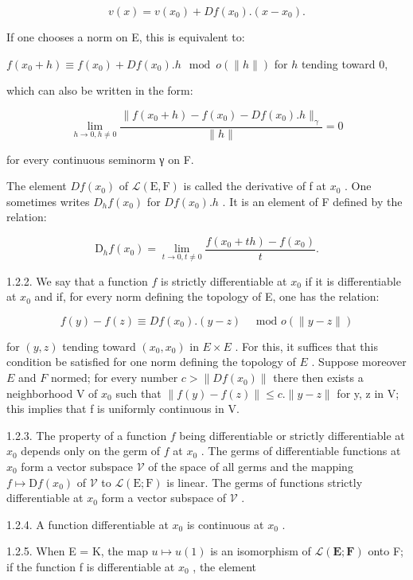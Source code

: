 \[
v (x) = v \left(x _ {0}\right) + D f \left(x _ {0}\right). \left(x - x _ {0}\right).
\]

If one chooses a norm on E, this is equivalent to:

\(f(x_0 + h) \equiv f(x_0) + Df(x_0).h \mod o(\|h\|)\) for \(h\) tending toward 0,

which can also be written in the form:

\[
\lim _ {h \rightarrow 0, h \neq 0} \frac {\| f (x _ {0} + h) - f (x _ {0}) - D f (x _ {0}) . h \| _ {\gamma}}{\| h \|} = 0
\]

for every continuous seminorm γ on F.

The element \(Df(x_{0})\) of \(\mathcal{L}(\mathrm{E},\mathrm{F})\) is called the derivative of f at \(x_{0}\) . One sometimes writes \(D_{h}f(x_{0})\) for \(Df(x_{0}).h\) . It is an element of F defined by the relation:

\[
\mathrm{D} _ {h} f (x _ {0}) = \lim _ {t \rightarrow 0, t \neq 0} \frac {f (x _ {0} + t h) - f (x _ {0})}{t}.
\]

1.2.2. We say that a function \(f\) is strictly differentiable at \(x_{0}\) if it is differentiable at \(x_{0}\) and if, for every norm defining the topology of E, one has the relation:

\[
f (y) - f (z) \equiv D f (x _ {0}). (y - z) \quad \text {   mod   } o (\| y - z \|)
\]

for \((y, z)\) tending toward \((x_0, x_0)\) in \(E \times E\) . For this, it suffices that this condition be satisfied for one norm defining the topology of \(E\) . Suppose moreover \(E\) and \(F\) normed; for every number \(c > \|Df(x_0)\|\) there then exists a neighborhood V of \(x_{0}\) such that \(\|f(y)-f(z)\|\leqslant c.\|y-z\|\) for y, z in V; this implies that f is uniformly continuous in V.

1.2.3. The property of a function \(f\) being differentiable or strictly differentiable at \(x_{0}\) depends only on the germ of \(f\) at \(x_{0}\) . The germs of differentiable functions at \(x_{0}\) form a vector subspace \(\mathcal{V}\) of the space of all germs and the mapping \(f\mapsto\mathrm{D}f(x_{0})\) of \(\mathcal{V}\) to \(\mathcal{L}(\mathrm{E};\mathrm{F})\) is linear. The germs of functions strictly differentiable at \(x_{0}\) form a vector subspace of \(\mathcal{V}\) .

1.2.4. A function differentiable at \(x_0\) is continuous at \(x_0\) .

1.2.5. When E = K, the map \(u \mapsto u(1)\) is an isomorphism of \(\mathcal{L}(\mathbf{E}; \mathbf{F})\) onto F; if the function f is differentiable at \(x_{0}\) , the element

